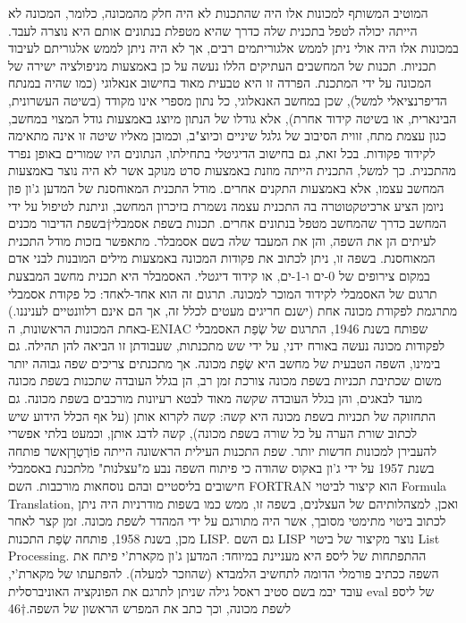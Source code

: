         המוטיב המשותף למכונות אלו היה שהתכנות לא היה חלק מהמכונה, כלומר, המכונה לא
        הייתה יכולה לטפל בתכנית שלה כדרך שהיא מטפלת בנתונים אותם היא נוצרה לעבד.
        במכונות אלו היה אולי ניתן לממש אלגוריתמים רבים, אך לא היה ניתן לממש אלגוריתם
        לעיבוד תכניות. תכנות של המחשבים העתיקים הללו נעשה על כן באמצעות מניפולציה ישירה
        של המכונה על ידי המתכנת. הפרדה זו היא טבעית מאוד בחישוב אנאלוגי (כמו שהיה
        במנתח הדיפרנציאלי למשל), שכן במחשב האנאלוגי, כל נתון מספרי אינו מקודד (בשיטה
        העשרונית, הבינארית, או בשיטה קידוד אחרת), אלא גודלו של הנתון מיוצג באמצעות גודל
        המצוי במחשב, כגון עצמת מתח, זווית הסיבוב של גלגל שיניים וכיוצ"ב, וכמובן מאליו
        שיטה זו אינה מתאימה לקידוד פקודות. בכל זאת, גם בחישוב הדיגיטלי בתחילתו,
        הנתונים היו שמורים באופן נפרד מהתכנית. כך למשל, התכנית הייתה מוזנת באמצעות סרט
        מנוקב אשר לא היה נוצר באמצעות המחשב עצמו, אלא באמצעות התקנים אחרים. מודל התכנית
        המאוחסנת של המדען ג'ון פון ניומן הציע ארכיטקטוטרה בה התכנית עצמה נשמרת בזיכרון
        המחשב, וניתנת לטיפול על ידי המחשב כדרך שהמחשב מטפל בנתונים אחרים. תכנות בשפת
        אסמבלי†{בשפת הדיבור מכנים לעיתים הן את השפה, והן את המעבד שלה בשם אסמבלר.} מתאפשר בזכות מודל התכנית המאוחסנת. בשפה זו, ניתן לכתוב את פקודות
        המכונה באמצעות מילים המובנות לבני אדם במקום צירופים של 0-ים ו-1-ים, או קידוד
        דיגטלי. האסמבלר היא תכנית מחשב המבצעת תרגום של האסמבלי לקידוד המוכר למכונה.
        תרגום זה הוא אחד-לאחד: כל פקודת אסמבלי מתרגמת לפקודת מכונה אחת (ישנם חריגים
        מעטים לכלל זה, אך הם אינם רלוונטיים לעניננו.) באחת המכונות הראשונות, ה-ENIAC
        שפותח בשנת 1946, התרגום של שְׂפַת האסמבלי לפקודות מכונה נעשה באורח ידני, על ידי שש
        מתכנתות, שעבודתן זו הביאה להן תהילה. גם בימינו, השפה הטבעית של מחשב היא שְׂפַת
        מכונה. אך מתכנתים צריכים שפה גבוהה יותר משום שכתיבת תכניות בשפת מכונה צורכת
        זמן רב, הן בגלל העובדה שתכנות בשפת מכונה מועד לבאגים, והן בגלל העובדה שקשה
        מאוד לבטא רעיונות מורכבים בשפת מכונה. גם התחזוקה של תכניות בשפת מכונה היא
        קשה: קשה לקרוא אותן (על אף הכלל הידוע שיש לכתוב שורת הערה על כל שורה בשפת
        מכונה), קשה לדבג אותן, וכמעט בלתי אפשרי להעבירן למכונות חדשות יותר. שפת התכנות
        העילית הראשונה הייתה פוֹרְטְרָןאשר פותחה בשנת 1957 על ידי ג'ון באקוס שהודה כי פיתוח
        השפה נבע מ"עצלנות" מלתכנת באסמבלי חישובים בליסטיים ובהם נוסחאות מורכבות. השם
        FORTRAN הוא קיצור לביטוי Formula Translation, ואכן, למצהלותיהם של העצלנים, בשפה
        זו, ממש כמו בשפות מודרניות היה ניתן לכתוב ביטוי מתימטי מסובך, אשר היה מתורגם על
        ידי המהדר לשפת מכונה. זמן קצר לאחר מכן, בשנת 1958, פותחה שְׂפַת התכנות LISP. גם
        השם LISP נוצר מקיצור של ביטוי List Processing. ההתפתחות של ליספ היא מעניינת
        במיוחד: המדען ג'ון מקארת'י פיתח את השפה ככתיב פורמלי הדומה לתחשיב הלמבדא
        (שהוזכר למעלה). להפתעתו של מקארת'י, עובד יבמ בשם סטיב ראסל גילה שניתן לתרגם את
        הפונקציה האוניברסלית eval של ליספ לשפת מכונה, וכך כתב את המפרש הראשון של
        השפה.†{46}

